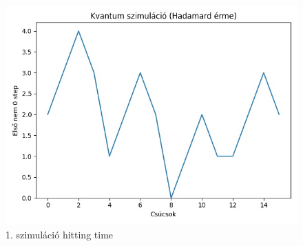 \documentclass[14pt,a4paper]{article}
\begin{document}
\begin{figure}[H]
\centering
\includegraphics[width = 0.7\columnwidth]{sim_01/hitting_time.jpg}
\caption{1. szimuláció hitting time}
\end{figure}
\end{document}
